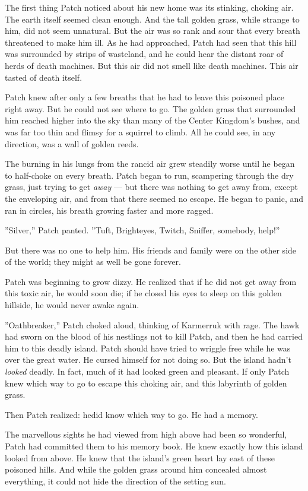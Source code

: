 \documentclass[12pt]{book}
\begin{document}
The first thing Patch noticed about his new home was its stinking,
choking air. The earth itself seemed clean enough. And the tall golden
grass, while strange to him, did not seem unnatural. But the air was
so rank and sour that every breath threatened to make him ill. As he
had approached, Patch had seen that this hill was surrounded by strips
of wasteland, and he could hear the distant roar of herds of death
machines. But this air did not smell like death machines. This air
tasted of death itself.

Patch knew after only a few breaths that he had to leave this poisoned
place right away. But he could not see where to go. The golden grass
that surrounded him reached higher into the sky than many of the
Center Kingdom's bushes, and was far too thin and flimsy for a
squirrel to climb. All he could see, in any direction, was a wall of
golden reeds.

The burning in his lungs from the rancid air grew steadily worse until
he began to half-choke on every breath. Patch began to run, scampering
through the dry grass, just trying to get \textit{away} --- but there
was nothing to get away from, except the enveloping air, and from that
there seemed no escape. He began to panic, and ran in circles, his
breath growing faster and more ragged.

''Silver,'' Patch panted. ''Tuft, Brighteyes, Twitch, Sniffer,
somebody, help!''

But there was no one to help him. His friends and family were on the
other side of the world; they might as well be gone forever.

Patch was beginning to grow dizzy. He realized that if he did not get
away from this toxic air, he would soon die; if he closed his eyes to
sleep on this golden hillside, he would never awake again.

''Oathbreaker,'' Patch choked aloud, thinking of Karmerruk with
rage. The hawk had sworn on the blood of his nestlings not to kill
Patch, and then he had carried him to this deadly island. Patch should
have tried to wriggle free while he was over the great water. He
cursed himself for not doing so. But the island hadn't \textit{looked}
deadly. In fact, much of it had looked green and pleasant. If only
Patch knew which way to go to escape this choking air, and this
labyrinth of golden grass.

Then Patch realized: he\textit{}did know which way to go. He had a
memory.

The marvellous sights he had viewed from high above had been so
wonderful, Patch had committed them to his memory book. He knew
exactly how this island looked from above. He knew that the island's
green heart lay east of these poisoned hills. And while the golden
grass around him concealed almost everything, it could not hide the
direction of the setting sun.
\end{document}
